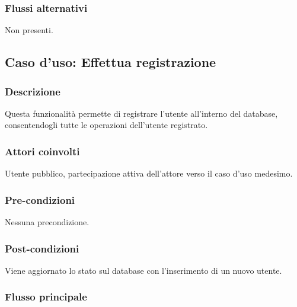	\subsubsection*{Flussi alternativi}
	Non presenti.

%
%
\subsection{Caso d'uso: Effettua registrazione}

	\subsubsection*{Descrizione}
	Questa funzionalità permette di registrare l'utente all'interno del database, consentendogli tutte le operazioni dell'utente registrato.
	
	\subsubsection*{Attori coinvolti}
	Utente pubblico, partecipazione attiva dell'attore verso il caso d'uso medesimo.
	
	\subsubsection*{Pre-condizioni}
	Nessuna precondizione.
	
	\subsubsection*{Post-condizioni}
	Viene aggiornato lo stato sul database con l'inserimento di un nuovo utente.
	
	\subsubsection*{Flusso principale}
	
